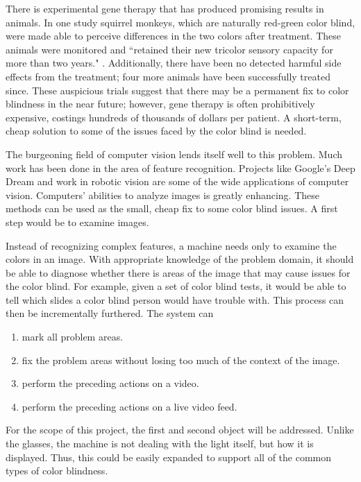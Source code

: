 \documentclass[12pt]{article}
\begin{document}
There is experimental gene therapy that has produced promising results in animals.\cite{MITMonkey} In one study squirrel monkeys, which are naturally red-green color blind, were made able to perceive differences in the two colors after treatment. These animals were monitored and ``retained their new tricolor sensory capacity for more than two years." \cite{MITMonkey}. Additionally, there have been no detected harmful side effects from the treatment; four more animals have been successfully treated since. These auspicious trials suggest that there may be a permanent fix to color blindness in the near future; however, gene therapy is often prohibitively expensive, costings hundreds of thousands of dollars per patient. A short-term, cheap solution to some of the issues faced by the color blind is needed. 

The burgeoning field of computer vision lends itself well to this problem. Much work has been done in the area of feature recognition. Projects like Google's Deep Dream and work in robotic vision are some of the wide applications of computer vision. Computers' abilities to analyze images is greatly enhancing. These methods can be used as the small, cheap fix to some color blind issues. A first step would be to examine images.

Instead of recognizing complex features, a machine needs only to examine the colors in an image. With appropriate knowledge of the problem domain, it should be able to diagnose whether there is areas of the image that may cause issues for the color blind. For example, given a set of color blind tests, it would be able to tell which slides a color blind person would have trouble with. This process can then be incrementally furthered. The system can

\singlespacing
\begin{enumerate}
	\item mark all problem areas.
	\item fix the problem areas without losing too much of the context of the image.
	\item perform the preceding actions on a video.
	\item perform the preceding actions on a live video feed.
\end{enumerate}
\doublespacing

For the scope of this project, the first and second object will be addressed. Unlike the glasses, the machine is not dealing with the light itself, but how it is displayed. Thus, this could be easily expanded to support all of the common types of color blindness. 
\end{document}
